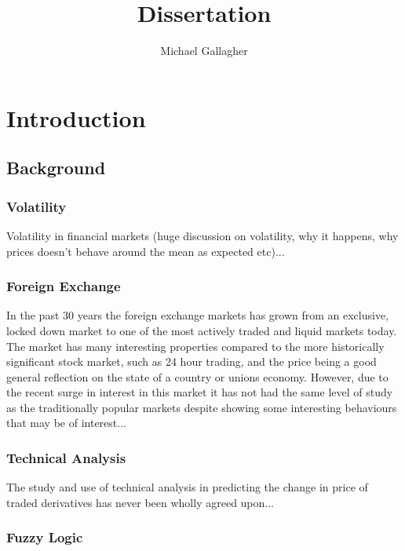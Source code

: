 \documentclass{article}
\title{Dissertation}
\author{Michael Gallagher}
\begin{document}
\maketitle

\tableofcontents

\section{Introduction}

\subsection{Background}

\subsubsection{Volatility}

Volatility in financial markets (huge discussion on volatility, why it happens, why prices doesn't behave around the mean as expected etc)...

\subsubsection{Foreign Exchange}

In the past 30 years the foreign exchange markets has grown from an exclusive, locked down market to one of the most actively traded and liquid markets today. The market has many interesting properties compared to the more historically significant stock market, such as 24 hour trading, and the price being a good general reflection on the state of a country or unions economy. However, due to the recent surge in interest in this market it has not had the same level of study as the traditionally popular markets despite showing some interesting behaviours that may be of interest...

\subsubsection{Technical Analysis}

The study and use of technical analysis in predicting the change in price of traded derivatives has never been wholly agreed upon...

\subsubsection{Fuzzy Logic}
\end{document}
